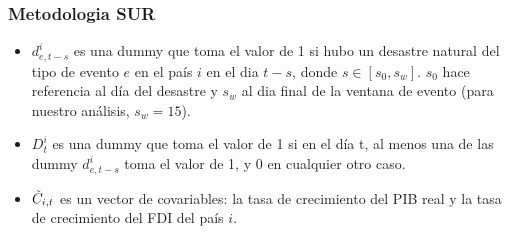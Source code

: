 \documentclass{beamer}
\begin{document}
\begin{frame}
\frametitle{Metodologia SUR}
\begin{itemize}
    \item $d_{e,t-s}^i$ es una dummy que toma el valor de 1 si hubo un desastre natural del tipo de evento $e$ en el país $i$ en el dia $t-s$, donde $s \in [s_0,s_w]$. $s_0$ hace referencia al día del desastre y $s_w$ al dia final de la ventana de evento (para nuestro análisis, $s_w=15$).
    \item $D_t^{i}$ es una dummy que toma el valor de 1 si en el día t, al menos una de las dummy $d_{e,t-s}^i$ toma el valor de 1, y 0 en cualquier otro caso.
    \item $\Tilde{C}_{i,t}$ es un vector de covariables: la tasa de crecimiento del PIB real y la tasa de crecimiento del FDI del país $i$.
\end{itemize}
\end{frame}
\end{document}
